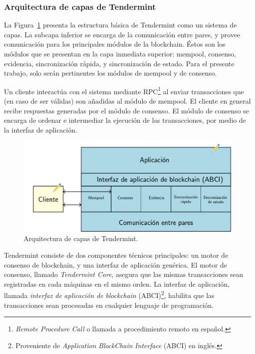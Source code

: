 \subsubsection{Arquitectura de capas de Tendermint}\label{subsec:layers}

La Figura~\ref{fig:tendermint-architecture} presenta la estructura básica de Tendermint como un sistema de capas.
La subcapa inferior se encarga de la comunicación entre pares, y provee comunicación para los principales
módulos de la blockchain. Éstos son los módulos que se presentan en la capa inmediata superior: mempool, consenso,
evidencia, sincronización rápida, y sincronización de estado. Para el presente trabajo, solo serán pertinentes los
módulos de mempool y de consenso.

Un cliente interactúa con el sistema mediante RPC\footnote{\textit{Remote Procedure Call} o llamada a procedimiento
remoto en español.} al enviar transacciones
que (en caso de ser válidas) son añadidas al módulo de mempool. El cliente en general
recibe respuestas generadas por el módulo de consenso.
El módulo de consenso se encarga de ordenar e intermediar la ejecución de las transacciones, por medio de la
interfaz de aplicación.

\begin{figure}
  \centering
  \includegraphics[scale=0.2]{figures/tendermint-layers.png}
  \caption{Arquitectura de capas de Tendermint.}
  \label{fig:tendermint-architecture}
\end{figure}

Tendermint consiste de dos componentes técnicos principales: un motor de consenso de blockchain, y una interfaz
de aplicación genérica.
%
El motor de consenso, llamado \textit{Tendermint Core}, asegura que las mismas transacciones sean registradas en cada
máquinas en el mismo orden.
%
La interfaz de aplicación, llamada \textit{interfaz de aplicación de blockchain} (ABCI)\footnote{Proveniente de \textit{Application
BlockChain Interface} (ABCI) en inglés.}, habilita que las transacciones
sean procesadas en cualquier lenguaje de programación.

